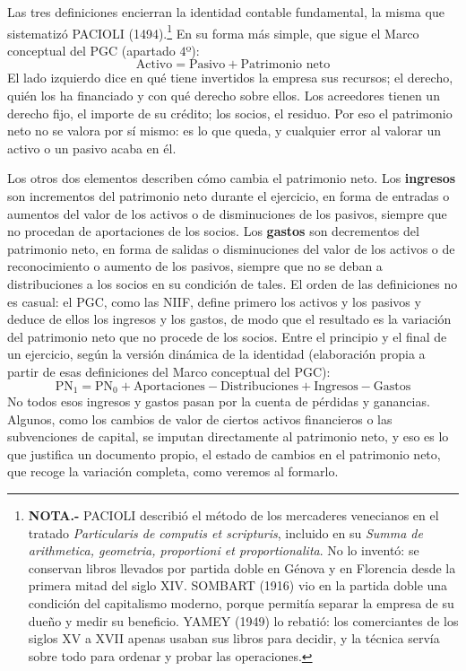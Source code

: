 \documentclass[10pt,a4paper]{article}
\begin{document}
Las tres definiciones encierran la identidad contable fundamental, la misma que sistematizó PACIOLI (1494).\footnote{%
    \textbf{NOTA.-} PACIOLI describió el método de los mercaderes venecianos en el tratado \textit{Particularis de computis et scripturis}, incluido en su \textit{Summa de arithmetica, geometria, proportioni et proportionalita}. No lo inventó: se conservan libros llevados por partida doble en Génova y en Florencia desde la primera mitad del siglo XIV. SOMBART (1916) vio en la partida doble una condición del capitalismo moderno, porque permitía separar la empresa de su dueño y medir su beneficio. YAMEY (1949) lo rebatió: los comerciantes de los siglos XV a XVII apenas usaban sus libros para decidir, y la técnica servía sobre todo para ordenar y probar las operaciones.
} En su forma más simple, que sigue el Marco conceptual del PGC (apartado $4$º):
$$\text{Activo} = \text{Pasivo} + \text{Patrimonio neto}$$
El lado izquierdo dice en qué tiene invertidos la empresa sus recursos; el derecho, quién los ha financiado y con qué derecho sobre ellos. Los acreedores tienen un derecho fijo, el importe de su crédito; los socios, el residuo. Por eso el patrimonio neto no se valora por sí mismo: es lo que queda, y cualquier error al valorar un activo o un pasivo acaba en él.

Los otros dos elementos describen cómo cambia el patrimonio neto. Los \textbf{ingresos} son incrementos del patrimonio neto durante el ejercicio, en forma de entradas o aumentos del valor de los activos o de disminuciones de los pasivos, siempre que no procedan de aportaciones de los socios. Los \textbf{gastos} son decrementos del patrimonio neto, en forma de salidas o disminuciones del valor de los activos o de reconocimiento o aumento de los pasivos, siempre que no se deban a distribuciones a los socios en su condición de tales. El orden de las definiciones no es casual: el PGC, como las NIIF, define primero los activos y los pasivos y deduce de ellos los ingresos y los gastos, de modo que el resultado es la variación del patrimonio neto que no procede de los socios. Entre el principio y el final de un ejercicio, según la versión dinámica de la identidad (elaboración propia a partir de esas definiciones del Marco conceptual del PGC):
$$\text{PN}_1 = \text{PN}_0 + \text{Aportaciones} - \text{Distribuciones} + \text{Ingresos} - \text{Gastos}$$
No todos esos ingresos y gastos pasan por la cuenta de pérdidas y ganancias. Algunos, como los cambios de valor de ciertos activos financieros o las subvenciones de capital, se imputan directamente al patrimonio neto, y eso es lo que justifica un documento propio, el estado de cambios en el patrimonio neto, que recoge la variación completa, como veremos al formarlo.
\end{document}
